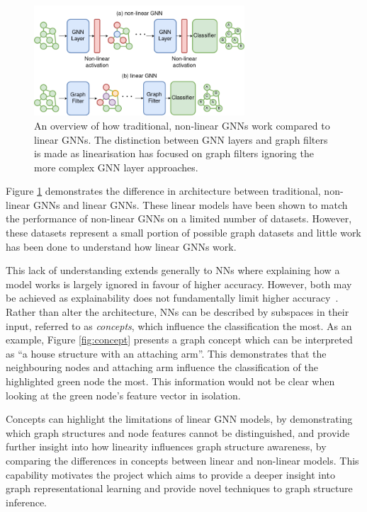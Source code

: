 \begin{figure}
    \centering
    \includegraphics[width=0.7\textwidth]{figures/linear-vs-non-linear}
    \caption{An overview of how traditional, non-linear GNNs work compared to linear GNNs. The distinction between GNN layers and graph filters is made as linearisation has focused on graph filters ignoring the more complex GNN layer approaches.}
    \label{fig:linear-vs-non-linear}
\end{figure}

Figure \ref{fig:linear-vs-non-linear} demonstrates the difference in architecture between traditional, non-linear GNNs and linear GNNs.
These linear models have been shown to match the performance of non-linear GNNs on a limited number of datasets.
However, these datasets represent a small portion of possible graph datasets and little work has been done to understand how linear GNNs work.


This lack of understanding extends generally to NNs where explaining how a model works is largely ignored in favour of higher accuracy.
However, both may be achieved as explainability does not fundamentally limit higher accuracy~\cite{zarlenga2022concept}.
Rather than alter the architecture, NNs can be described by subspaces in their input, referred to as \emph{concepts}, which influence the classification the most.
As an example, Figure \ref{fig:concept} presents a graph concept which can be interpreted as ``a house structure with an attaching arm''.
This demonstrates that the neighbouring nodes and attaching arm influence the classification of the highlighted green node the most.
This information would not be clear when looking at the green node's feature vector in isolation.

Concepts can highlight the limitations of linear GNN models, by demonstrating which graph structures and node features cannot be distinguished, and provide further insight into how linearity influences graph structure awareness, by comparing the differences in concepts between linear and non-linear models.
This capability motivates the project which aims to provide a deeper insight into graph representational learning and provide novel techniques to graph structure inference.

